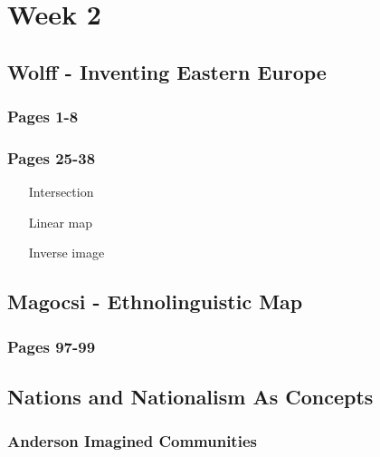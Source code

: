 \documentclass[11pt,fleqn]{book} %
\begin{document}
\chapter{Week 2}
\section{Wolff - Inventing Eastern Europe}
\subsection{Pages 1-8}
\begin{definition}[]

\end{definition}

\begin{example}

\end{example}

\subsection{Pages 25-38}
\begin{itemize}
\item[Intersection] 
\item[Linear map] 
\item[Inverse image] 
\end{itemize}

\section{Magocsi - Ethnolinguistic Map }
\subsection{Pages 97-99}

\begin{example}

\end{example}

\begin{theorem}[]

\end{theorem}

\section{Nations and Nationalism As Concepts}

\subsection{Anderson Imagined Communities}
\end{document}
